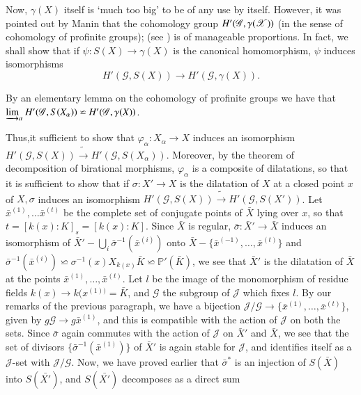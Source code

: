 Now, $\gamma (X)$ itself is `much too big' to be of any use by
itself. However, it was pointed out by Manin that the cohomology group
$H'\break(\mathscr{G,\gamma (X)})$ (in the sense of cohomology of profinite
groups); (see \cite{key21}) is of manageable proportions. In fact, we shall
show that if $\psi : S(X) \to \gamma (X)$ is the canonical
homomorphism, $\psi$ induces isomorphisms 
$$
H'(\mathscr{G}, S(X)) \to H'(\mathscr{G} , \gamma (X)).
$$

By an elementary lemma on the cohomology of profinite groups we have
that $\varinjlim_{\alpha} H' (\mathscr{G}, S(X_{\alpha})) \backsimeq
H' (\mathscr{G}, \gamma (X))$. 

Thus,\pageoriginale it sufficient to show that $\varphi_{\alpha} :
X_{\alpha} \to X$ 
induces an isomorphism $H' (\mathscr{G}, S(X)) \tilde{\to} H'
(\mathscr{G}, S(X_\alpha))$. Moreover, by the theorem of decomposition of
birational morphisms, $\varphi_{\alpha}$ is a composite of
dilatations, so that it is sufficient to show that if $\sigma : X' \to
X$ is the dilatation of $X$ at a closed point $x$ of $X, \sigma$
induces an isomorphism $H' (\mathscr{G}, S(X)) \tilde{\to} H'
(\mathscr{G}, S(X'))$. Let $\bar{x}^{(1)}, \ldots \bar{x}^{(t)}$ be
the complete set of conjugate points of $\bar{X}$ lying over $x$, so
that $t = [k(x) : K]_s = [k (x):K]$. Since $\bar{X}$ is regular,
$\bar{\sigma}: \bar{X}' \to \bar{X}$ induces an isomorphism of
$\bar{X}'- \bigcup\limits_{i} \bar{\sigma}^{-1} (\bar{x}^{(i)})$ onto
$\bar{X}- \{\bar{x}^{(-1)}, \ldots, \bar{x}^{(t)}\}$ and
$\bar{\sigma}^{-1}(\bar{x}^{(i)})\backsimeq \sigma ^{-1} (x) X_{k(x)}
\bar{K} \backsimeq \mathbb{P}' (\bar{K})$, we see that $\bar{X}'$ is
the dilatation of $\bar{X}$ at the points $\bar{x}^{(1)}, \ldots ,
\bar{x}^{(t)}$. Let $l$ be the image  of the monomorphism of residue
fields $k(x) \to k(x^{(1))}= \bar{K}$, and $\mathscr{G}$ the subgroup
of $\mathscr{J}$ which fixes $l$. By our remarks of the previous
paragraph, we have a bijection $\mathscr{J}/ \mathscr{G}\to
\{\bar{x}^{(1)} , \ldots, \bar{x}^{(t)}\}$, given by $g \mathscr{G} \to g
\bar{x}^{(1)}$, and this is compatible with the action of $\mathscr{J}$
on both the sets. Since $\bar{\sigma}$ again commutes with the action of
$\mathscr{J}$ on $\bar{X}'$ and $\bar{X}$, we see that the set of
divisors $\{\bar{\sigma}^{-1} (\bar{x}^{(1)})\}$ of $\bar{X}'$  is again
stable for $\mathscr{J}$, and identifies itself as a
$\mathscr{J}$-set with $\mathscr{J}/ \mathscr{G}$. Now, we have proved
earlier that $\bar{\sigma}^*$ is an injection of $S(\bar{X})$ into
$S(\bar{X'})$, and $S(\bar{X'})$ decomposes as a direct sum 
